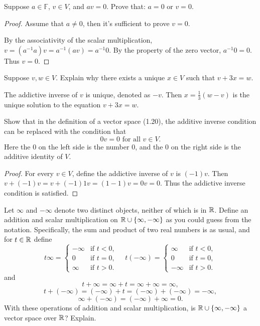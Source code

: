 \documentclass{article}
\begin{document}
\begin{problem}[1B-2]
Suppose $ a\in\mathbb{F} $, $ v\in V $, and $ av=0 $. Prove that: $ a=0 $ or $ v=0 $.
\end{problem}

\begin{proof}
Assume that $ a\neq 0 $, then it's sufficient to prove $ v=0 $.\par 
By the associativity of the scalar multiplication, $ v=(a^{-1}a)v=a^{-1}(av)=a^{-1}0 $. By the property of the zero vector, $ a^{-1}0=0 $. Thus $ v=0 $.
\end{proof}

\begin{problem}[1B-3]
Suppose $v, w \in V$. Explain why there exists a unique $x \in V$ such that $v + 3x = w$.
\end{problem}

\begin{solution}
The addictive inverse of $ v $ is unique, denoted as $ -v $. Then $ x=\frac{1}{3}(w-v) $ is the unique solution to the equation $ v+3x=w $.
\end{solution}

\begin{problem}[1B-5]
Show that in the definition of a vector space (1.20), the additive inverse condition can be replaced with the condition that
\[ 0v=0 \text{ for all }v\in V. \]
Here the 0 on the left side is the number 0, and the 0 on the right side is the additive identity of $ V $.
\end{problem}

\begin{proof}
For every $ v\in V $, define the addictive inverse of $ v $ is $ (-1)v $. Then $ v+(-1)v=v+(-1)1v=(1-1)v=0v=0 $. Thus the addictive inverse condition is satisfied.
\end{proof}

\begin{problem}[1B-6]
Let $\infty$ and $-\infty$ denote two distinct objects, neither of which is in $\mathbb{R}$. Define an addition and scalar multiplication on $\mathbb{R} \cup \{ \infty, -\infty \}$ as you could guess from the notation. Specifically, the sum and product of two real numbers is as usual, and for $t \in \mathbb{R}$ define
\[
t\infty = 
\begin{cases} 
-\infty & \text{if } t < 0, \\
0 & \text{if } t = 0, \\
\infty & \text{if } t > 0.
\end{cases}
\quad
t(-\infty) = 
\begin{cases} 
\infty & \text{if } t < 0, \\
0 & \text{if } t = 0, \\
-\infty & \text{if } t > 0.
\end{cases}
\]
and
\[
t + \infty = \infty + t = \infty + \infty = \infty,
\]
\[
t + (-\infty) = (-\infty) + t = (-\infty) + (-\infty) = -\infty,
\]
\[
\infty + (-\infty) = (-\infty) + \infty = 0.
\]
With these operations of addition and scalar multiplication, is $\mathbb{R} \cup \{ \infty, -\infty \}$ a vector space over $\mathbb{R}$? Explain.
\end{problem}
\end{document}
